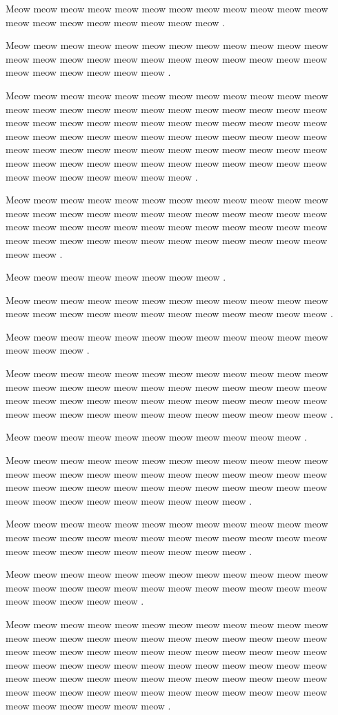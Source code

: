 \documentclass[12pt, a5paper, openany]{book}
\begin{document}
Meow meow meow meow meow meow meow meow meow meow meow meow meow meow meow meow meow meow meow meow .

Meow meow meow meow meow meow meow meow meow meow meow meow meow meow meow meow meow meow meow meow meow meow meow meow meow meow meow meow meow meow .

Meow meow meow meow meow meow meow meow meow meow meow meow meow meow meow meow meow meow meow meow meow meow meow meow meow meow meow meow meow meow meow meow meow meow meow meow meow meow meow meow meow meow meow meow meow meow meow meow meow meow meow meow meow meow meow meow meow meow meow meow meow meow meow meow meow meow meow meow meow meow meow meow meow meow meow meow meow meow meow .

Meow meow meow meow meow meow meow meow meow meow meow meow meow meow meow meow meow meow meow meow meow meow meow meow meow meow meow meow meow meow meow meow meow meow meow meow meow meow meow meow meow meow meow meow meow meow meow meow meow meow .

Meow meow meow meow meow meow meow meow .

Meow meow meow meow meow meow meow meow meow meow meow meow meow meow meow meow meow meow meow meow meow meow meow meow .

Meow meow meow meow meow meow meow meow meow meow meow meow meow meow meow .

Meow meow meow meow meow meow meow meow meow meow meow meow meow meow meow meow meow meow meow meow meow meow meow meow meow meow meow meow meow meow meow meow meow meow meow meow meow meow meow meow meow meow meow meow meow meow meow meow .

Meow meow meow meow meow meow meow meow meow meow meow .

Meow meow meow meow meow meow meow meow meow meow meow meow meow meow meow meow meow meow meow meow meow meow meow meow meow meow meow meow meow meow meow meow meow meow meow meow meow meow meow meow meow meow meow meow meow .

Meow meow meow meow meow meow meow meow meow meow meow meow meow meow meow meow meow meow meow meow meow meow meow meow meow meow meow meow meow meow meow meow meow .

Meow meow meow meow meow meow meow meow meow meow meow meow meow meow meow meow meow meow meow meow meow meow meow meow meow meow meow meow meow .

Meow meow meow meow meow meow meow meow meow meow meow meow meow meow meow meow meow meow meow meow meow meow meow meow meow meow meow meow meow meow meow meow meow meow meow meow meow meow meow meow meow meow meow meow meow meow meow meow meow meow meow meow meow meow meow meow meow meow meow meow meow meow meow meow meow meow meow meow meow meow meow meow meow meow meow meow meow meow .
\end{document}
